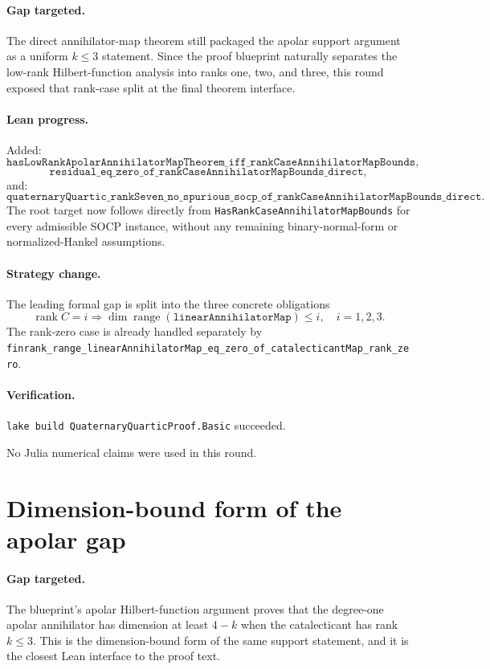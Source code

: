 \documentclass[11pt]{article}
\begin{document}
\paragraph{Gap targeted.}
The direct annihilator-map theorem still packaged the apolar support argument as
a uniform \(k \le 3\) statement.  Since the proof blueprint naturally separates
the low-rank Hilbert-function analysis into ranks one, two, and three, this
round exposed that rank-case split at the final theorem interface.

\paragraph{Lean progress.}
Added:
\[
\texttt{hasLowRankApolarAnnihilatorMapTheorem\_iff\_rankCaseAnnihilatorMapBounds},
\]
\[
\texttt{residual\_eq\_zero\_of\_rankCaseAnnihilatorMapBounds\_direct},
\]
and:
\[
\texttt{quaternaryQuartic\_rankSeven\_no\_spurious\_socp\_of\_rankCaseAnnihilatorMapBounds\_direct}.
\]
The root target now follows directly from
\texttt{HasRankCaseAnnihilatorMapBounds} for every admissible SOCP instance,
without any remaining binary-normal-form or normalized-Hankel assumptions.

\paragraph{Strategy change.}
The leading formal gap is split into the three concrete obligations
\[
\operatorname{rank} C = i \Rightarrow
\dim \operatorname{range}(\texttt{linearAnnihilatorMap}) \le i,
\quad i=1,2,3.
\]
The rank-zero case is already handled separately by
\texttt{finrank\_range\_linearAnnihilatorMap\_eq\_zero\_of\_catalecticantMap\_rank\_zero}.

\paragraph{Verification.}
\texttt{lake build QuaternaryQuarticProof.Basic} succeeded.

No Julia numerical claims were used in this round.

\section*{Dimension-bound form of the apolar gap}

\paragraph{Gap targeted.}
The blueprint's apolar Hilbert-function argument proves that the degree-one
apolar annihilator has dimension at least \(4-k\) when the catalecticant has
rank \(k \le 3\).  This is the dimension-bound form of the same support
statement, and it is the closest Lean interface to the proof text.
\end{document}
